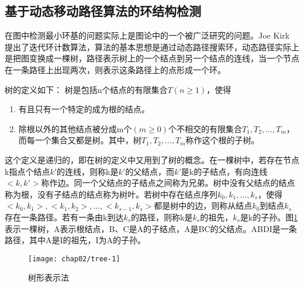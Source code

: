 \subsection{基于动态移动路径算法的环结构检测}
\label{}


在图中检测最小环基的问题实际上是图论中的一个被广泛研究的问题。Joe Kirk 提出了迭代环计数算法，算法的基本思想是通过动态路径搜索环，动态路径实际上是把图变换成一棵树，路径表示树上的一个结点到另一个结点的连线，当一个节点在一条路径上出现两次，则表示这条路径上的点形成一个环。

树的定义如下：
树是包括n个结点的有限集合$T(n \geq 1)$\cite{zhangming}，使得
\begin{enumerate}
\item 有且只有一个特定的成为根的结点。
\item 除根以外的其他结点被分成m个$(m \geq 0)$个不相交的有限集合$T_1, T_2, \ldots, T_m$，而每一个集合又都是树。其中，树$T_1, T_2, \ldots, T_m$称作这个根的子树。
\end{enumerate}

这个定义是递归的，即在树的定义中又用到了树的概念。在一棵树中，若存在节点k指点个结点$k'$的连线，则称k是$k'$的父结点，而$k'$是k的子结点，有向连线$<k, k'>$称作边。同一个父结点的子结点之间称为兄弟。树中没有父结点的结点称为根，没有子结点的结点称为树叶。若树中存在结点序列$k_0,k_1,\ldots,k_s$，使得$<k_0,k_1>,<k_1,k_2>,\ldots,<k_{s-1},k_s>$都是树中的边，则称从结点$k_0$到结点$k_s$存在一条路径。若有一条由k到达$k_s$的路径，则称k是$k_s$的祖先，$k_s$是k的子孙。图\ref{fig:tree}表示一棵树，A表示根结点，B、C是A的子结点，A是BC的父结点。ABDI是一条路径，其中A是I的祖先，I为A的子孙。

\begin{figure}[H]
\centering
\texttt{[image: chap02/tree-1]}
\caption{树形表示法}
\label{fig:tree}
\end{figure}


